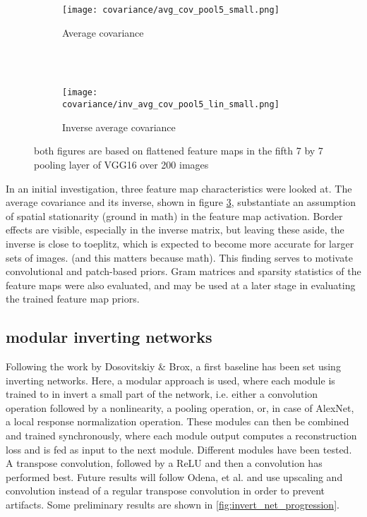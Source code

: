 \documentclass{article}
\begin{document}
\begin{figure}
	\centering
	\begin{subfigure}[b]{0.3\textwidth}
		\texttt{[image: covariance/avg\_cov\_pool5\_small.png]}
		\caption{Average covariance \\~}
		\label{fig:cov}
	\end{subfigure}
	~
	\begin{subfigure}[b]{0.3\textwidth}
		\texttt{[image: covariance/inv\_avg\_cov\_pool5\_lin\_small.png]}
		\caption{Inverse average covariance}
		\label{fig:inv_cov}
	\end{subfigure}
	\caption{both figures are based on flattened feature maps in the fifth 7 by 7 pooling layer of VGG16 over 200 images}
	\label{fig:cov_plots}
\end{figure}

In an initial investigation, three feature map characteristics were looked at. The average covariance and its inverse, shown in figure \ref{fig:cov_plots}, substantiate an assumption of spatial stationarity (ground in math) in the feature map activation. Border effects are visible, especially in the inverse matrix, but leaving these aside, the inverse is close to toeplitz, which is expected to become more accurate for larger sets of images. (and this matters because math). This finding serves to motivate convolutional and patch-based priors. Gram matrices and sparsity statistics of the feature maps were also evaluated, and may be used at a later stage in evaluating the trained feature map priors.

\subsection{modular inverting networks}

Following the work by Dosovitskiy \& Brox, a first baseline has been set using inverting networks. Here, a modular approach is used, where each module is trained to in invert a small part of the network, i.e. either a convolution operation followed by a nonlinearity, a pooling operation, or, in case of AlexNet, a local response normalization operation. These modules can then be combined and trained synchronously, where each module output computes a reconstruction loss and is fed as input to the next module. Different modules have been tested. A transpose convolution, followed by a ReLU and then a convolution has performed best. Future results will follow Odena, et al. and use upscaling and convolution instead of a regular transpose convolution in order to prevent artifacts. Some preliminary results are shown in \ref{fig:invert_net_progression}.
\end{document}
